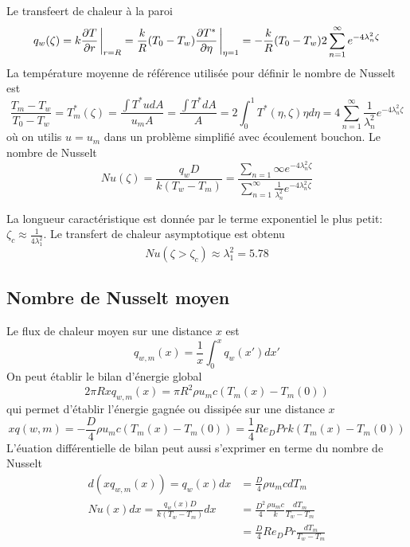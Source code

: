 \documentclass[a4paper,11pt]{report}
\newcommand{\recip}[1]{\frac{1}{#1}}
\begin{document}
      Le transfeert de chaleur à la paroi
      \begin{equation}
        q_w(\zeta) = k \pdv{T}{r}\eval_{r=R} = \frac{k}{R}(T_0 - T_w) \pdv{T^\ast}{\eta} \eval_{\eta = 1} = -\frac{k}{R} (T_0 - T_w) 2 \sum_{n=1}^\infty e^{-4 \lambda_n^2 \zeta}
      \end{equation}
      La température moyenne de référence utilisée pour définir le nombre de Nusselt est
      \begin{equation}
        \frac{T_m - T_w}{T_0 - T_w} = T_m^\ast(\zeta) = \frac{\int T^\ast u dA}{u_m A} = \frac{\int T^\ast dA}{A} = 2 \int_0^1 T^\ast(\eta, \zeta) \eta d\eta = 4 \sum_{n=1}^{\infty} \recip{\lambda_n^2}e^{-4 \lambda_n^2 \zeta}
      \end{equation}
      où on utilis $u=u_m$ dans un problème simplifié avec écoulement bouchon. Le nombre de Nusselt
      \begin{equation}
        Nu(\zeta) = \frac{q_w D}{k (T_w - T_m)} = \frac{\sum_{n=1}{\infty} e^{-4 \lambda_n^2 \zeta}}{\sum_{n=1}^\infty \recip{\lambda_n^2} e^{-4 \lambda_n^2 \zeta}}
      \end{equation}

      La longueur caractéristique est donnée par le terme exponentiel le plus petit: $\zeta_c \approx \recip{4 \lambda_1^2}$. Le transfert de chaleur asymptotique est obtenu
      \begin{equation}
        Nu(\zeta > \zeta_c) \approx \lambda_1^2 = 5.78
      \end{equation}

    \subsection{Nombre de Nusselt moyen}
      Le flux de chaleur moyen sur une distance $x$ est
      \begin{equation}
        q_{w,m} (x) = \recip{x} \int_0^x q_w(x') dx'
      \end{equation}
      On peut établir le bilan d'énergie global
      \begin{equation}
        2\pi R x q_{w, m}(x) = \pi R^2 \rho u_m c (T_m(x) - T_m(0))
      \end{equation}
      qui permet d'établir l'énergie gagnée ou dissipée sur une distance $x$
      \begin{equation}
          x q(w, m) = - \frac{D}{4} \rho u_m c (T_m(x) - T_m(0)) = \recip{4}Re_D Pr k (T_m(x) - T_m(0))
      \end{equation}
      L'éuation différentielle de bilan peut aussi s'exprimer en terme du nombre de Nusselt
      \begin{equation}
        \begin{aligned}
          d(x q_{w,m}(x)) = q_w(x) dx &= \frac{D}{4} \rho u_m c dT_m\\
          Nu(x)dx = \frac{q_w(x) D}{k (T_w - T_m)} dx &= \frac{D^2}{4} \frac{\rho u_m c}{k} \frac{dT_m}{T_w - T_m}\\
          &= \frac{D}{4} Re_D Pr \frac{dT_m}{T_w - T_m}
        \end{aligned}
      \end{equation}
\end{document}
